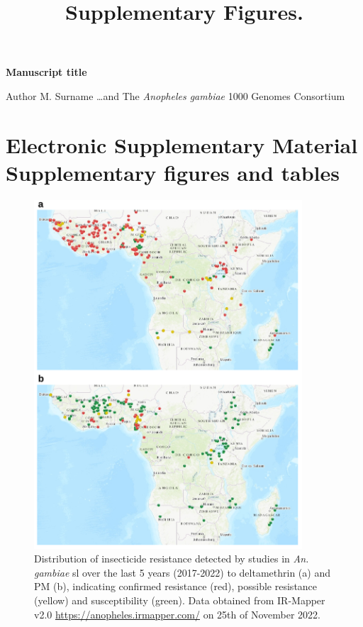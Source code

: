 \documentclass[a4paper,12pt]{article}
\title{Supplementary Figures.}
\begin{document}
\onehalfspacing

\begin{center}
	\Large
	\noindent \textbf{Manuscript title}

	\normalsize

	\vskip 3cm

\end{center}


\noindent Author M. Surname \ldots and The \textit{Anopheles gambiae} 1000 Genomes Consortium
 
\vskip 2cm 


\section*{Electronic Supplementary Material \\ Supplementary figures and tables}

\clearpage

\begin{figure}[h]
	\begin{center}
	\includegraphics*[width = 10cm]{./IRMapper_resistance_distribution.png}
	\caption{\footnotesize Distribution of insecticide resistance detected by studies in \textit{An. gambiae} sl over the last 5 years (2017-2022) to deltamethrin (a) and PM (b), indicating confirmed resistance (red), possible resistance (yellow) and susceptibility (green). Data obtained from IR-Mapper v2.0 \url{https://anopheles.irmapper.com/} on 25th of November 2022.}
	\end{center}
	\label{FigS1}
\end{figure}
\end{document}
